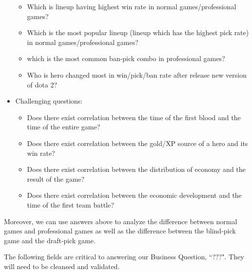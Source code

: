 \documentclass{article}
\begin{document}
\begin{itemize}
\begin{itemize}
        \item Which is lineup having highest win rate in normal games/professional games?
        \item Which is the most popular lineup (lineup which has the highest pick rate) in normal games/professional games?
        \item which is the most common ban-pick combo in professional games?
        \item Who is hero changed most in win/pick/ban rate after release new version of dota 2?
    \end{itemize}
    \item Challenging questions:
    \begin{itemize}
        \item Does there exist correlation between the time of the first blood and the time of the entire game?
        \item Does there exist correlation between the gold/XP source of a hero and its win rate?
        \item Does there exist correlation between the distribution of economy and the result of the game?
        \item Does there exist correlation between the economic development and the time of the first team battle?
    \end{itemize}
\end{itemize}
Moreover, we can use answers above to analyze the difference between normal games and professional games as well as the difference between the blind-pick game and the draft-pick game.


The following fields are critical to answering our Business Question, ``???".
They will need to be cleansed and validated.




\end{document}
